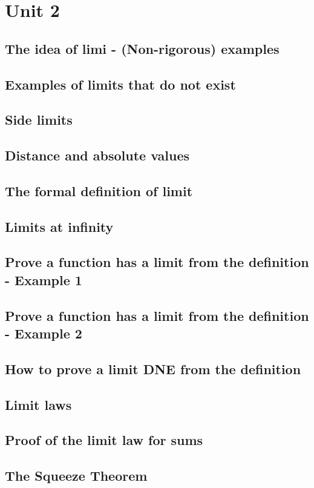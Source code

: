 \section*{Unit 2}

\setcounter{section}{2}

\subsection{The idea of limi - (Non-rigorous) examples}
\subsection{Examples of limits that do not exist}
\subsection{Side limits}
\subsection{Distance and absolute values}
\subsection{The formal definition of limit}
\subsection{Limits at infinity}
\subsection{Prove a function has a limit from the definition - Example 1}
\subsection{Prove a function has a limit from the definition - Example 2}
\subsection{How to prove a limit DNE from the definition}
\subsection{Limit laws}
\subsection{Proof of the limit law for sums}
\subsection{The Squeeze Theorem}
